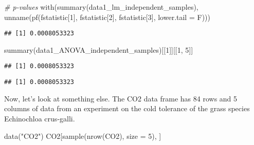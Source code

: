 \documentclass[
]{book}
\newenvironment{Shaded}{\begin{snugshade}}{\end{snugshade}}
\newcommand{\AttributeTok}[1]{\textcolor[rgb]{0.77,0.63,0.00}{#1}}
\newcommand{\CommentTok}[1]{\textcolor[rgb]{0.56,0.35,0.01}{\textit{#1}}}
\newcommand{\DecValTok}[1]{\textcolor[rgb]{0.00,0.00,0.81}{#1}}
\newcommand{\FunctionTok}[1]{\textcolor[rgb]{0.00,0.00,0.00}{#1}}
\newcommand{\NormalTok}[1]{#1}
\newcommand{\SpecialCharTok}[1]{\textcolor[rgb]{0.00,0.00,0.00}{#1}}
\newcommand{\StringTok}[1]{\textcolor[rgb]{0.31,0.60,0.02}{#1}}
\begin{document}
\begin{Shaded}
\begin{Highlighting}[]
\CommentTok{\# p{-}values}
\FunctionTok{with}\NormalTok{(}\FunctionTok{summary}\NormalTok{(data1\_lm\_independent\_samples), }\FunctionTok{unname}\NormalTok{(}\FunctionTok{pf}\NormalTok{(fstatistic[}\DecValTok{1}\NormalTok{],}
\NormalTok{    fstatistic[}\DecValTok{2}\NormalTok{], fstatistic[}\DecValTok{3}\NormalTok{], }\AttributeTok{lower.tail =}\NormalTok{ F)))}
\end{Highlighting}
\end{Shaded}

\begin{verbatim}
## [1] 0.0008053323
\end{verbatim}

\begin{Shaded}
\begin{Highlighting}[]
\FunctionTok{summary}\NormalTok{(data1\_ANOVA\_independent\_samples)[[}\DecValTok{1}\NormalTok{]][[}\DecValTok{1}\NormalTok{, }\DecValTok{5}\NormalTok{]]}
\end{Highlighting}
\end{Shaded}

\begin{verbatim}
## [1] 0.0008053323
\end{verbatim}

\begin{Shaded}
\end{Shaded}

\begin{verbatim}
## [1] 0.0008053323
\end{verbatim}

Now, let's look at something else. The CO2 data frame has 84 rows and 5
columns of data from an experiment on the cold tolerance of the grass
species Echinochloa crus-galli.

\begin{Shaded}
\begin{Highlighting}[]
\FunctionTok{data}\NormalTok{(}\StringTok{"CO2"}\NormalTok{)}
\NormalTok{CO2[}\FunctionTok{sample}\NormalTok{(}\FunctionTok{nrow}\NormalTok{(CO2), }\AttributeTok{size =} \DecValTok{5}\NormalTok{), ]}
\end{Highlighting}
\end{Shaded}
\end{document}
